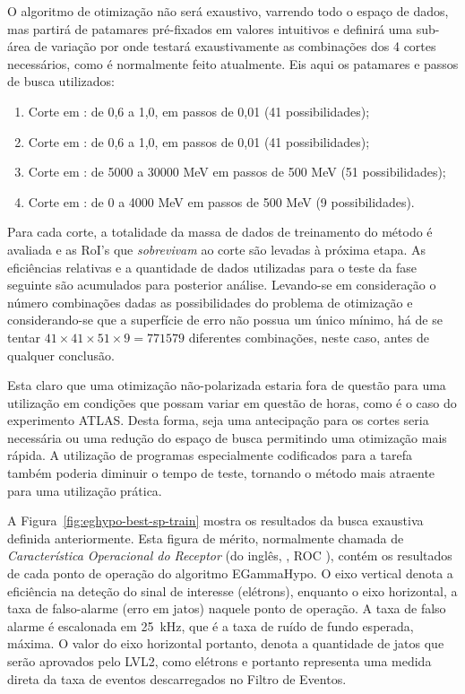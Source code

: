 O algoritmo de otimização não será exaustivo, varrendo todo o espaço de dados,
mas partirá de patamares pré-fixados em valores intuitivos e definirá uma
sub-área de variação por onde testará exaustivamente as combinações dos 4
cortes necessários, como é normalmente feito atualmente. Eis aqui os patamares
e passos de busca utilizados:

\begin{enumerate}
\item Corte em \rcore: de 0,6 a 1,0, em passos de 0,01 (41 possibilidades);
\item Corte em \eratio: de 0,6 a 1,0, em passos de 0,01 (41 possibilidades);
\item Corte em \etem: de 5000 a 30000 MeV em passos de 500 MeV (51
possibilidades);
\item Corte em \ethad: de 0 a 4000 MeV em passos de 500 MeV (9
possibilidades). 
\end{enumerate}

Para cada corte, a totalidade da massa de dados de treinamento do método é
avaliada e as RoI's que \textit{sobrevivam} ao corte são levadas à próxima
etapa. As eficiências relativas e a quantidade de dados utilizadas para o teste
da fase seguinte são acumulados para posterior análise. Levando-se em
consideração o número combinações dadas as possibilidades do problema de
otimização e considerando-se que a superfície de erro não possua um único
mínimo, há de se tentar $41 \times 41 \times 51 \times 9 = 771579$ diferentes
combinações, neste caso, antes de qualquer conclusão.

Esta claro que uma otimização não-polarizada estaria fora de questão para uma
utilização em condições que possam variar em questão de horas, como é o caso do
experimento ATLAS. Desta forma, seja uma antecipação para os cortes seria
necessária ou uma redução do espaço de busca permitindo uma otimização mais
rápida. A utilização de programas especialmente codificados para a tarefa
também poderia diminuir o tempo de teste, tornando o método mais atraente para
uma utilização prática.

A Figura~\ref{fig:eghypo-best-sp-train} mostra os resultados da busca
exaustiva definida anteriormente. Esta figura de mérito, normalmente
chamada de \textit{Característica Operacional do Receptor} (do inglês,
, ROC \cite{vantrees}), contém os
resultados de cada ponto de operação do algoritmo EGammaHypo. O eixo vertical
denota a eficiência na deteção do sinal de interesse (elétrons), enquanto o
eixo horizontal, a taxa de falso-alarme (erro em jatos) naquele ponto de
operação. A taxa de falso alarme é escalonada em 25~kHz, que é a taxa de ruído
de fundo esperada, máxima. O valor do eixo horizontal portanto, denota a
quantidade de jatos que serão aprovados pelo LVL2, como elétrons e portanto
representa uma medida direta da taxa de eventos descarregados no Filtro de
Eventos.

